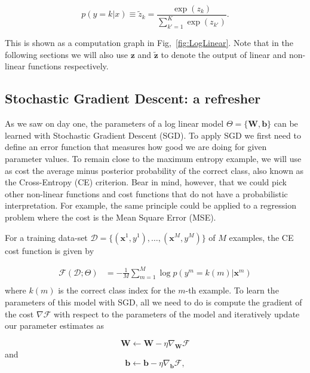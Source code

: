 \begin{equation}
p(y=k|{x}) \equiv \tilde{z}_k = \frac{\exp(z_k)}{\sum_{k'=1}^{K} \exp(z_{k'})}.
\label{eq:softmax}
\end{equation}

This is shown as a computation graph in Fig,~\ref{fig:LogLinear}. Note that in
the following sections we will also use $\mathbf{z}$ and $\tilde{\mathbf{z}}$
to denote the output of linear and non-linear functions respectively.

\subsection{Stochastic Gradient Descent: a refresher}

As we saw on day one, the parameters of a log linear model
$\Theta=\{\mathbf{W}, \mathbf{b}\}$ can be learned with Stochastic Gradient Descent (SGD). To apply SGD we first need to define an error function that measures how
good we are doing for given parameter values. %
 To remain close to the maximum
entropy example, we will use as cost the average minus posterior probability of
the correct class, also known as the Cross-Entropy (CE) criterion. Bear in
mind, however, that we could pick other non-linear functions and cost functions
that do not have
a probabilistic interpretation. For example, the same principle could be applied to
a regression problem where the cost is the Mean Square Error (MSE).

For a training data-set $\mathcal{D} = \{(\mathbf{x}^1,y^1), \ldots,
(\mathbf{x}^M,y^M)\}$ of $M$ examples, the CE cost function is given by

\begin{align}
\mathcal{F}(\mathcal{D};\Theta) 
& = -\frac{1}{M}\sum_{m=1}^{M} \log p(y^m=k(m) | \mathbf{x}^m) \\
\label{eq:CostLogPos}
\end{align}
%
where $k(m)$ is the correct class index for the $m$-th example.
To learn the parameters of this model with SGD, all we need to do is compute the gradient
of the cost $\nabla\mathcal{F}$ with respect to the parameters of the model and
iteratively update our  parameter estimates as 

\begin{equation}
\mathbf{W} \leftarrow \mathbf{W} - \eta \nabla_\mathbf{W}\mathcal{F}
\end{equation}
and
\begin{equation}
\mathbf{b} \leftarrow \mathbf{b} - \eta \nabla_\mathbf{b}\mathcal{F},
\end{equation}

